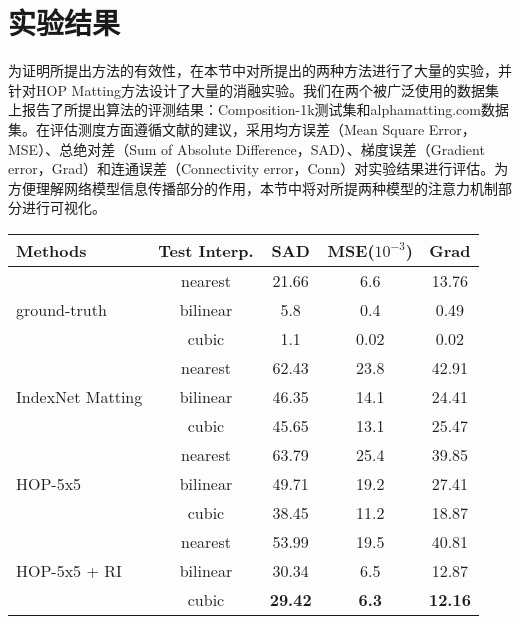 \section{实验结果}
为证明所提出方法的有效性，在本节中对所提出的两种方法进行了大量的实验，并针对HOP Matting方法设计了大量的消融实验。我们在两个被广泛使用的数据集上报告了所提出算法的评测结果：Composition-1k测试集\cite{xu2017deep}和alphamatting.com数据集\cite{rhemann2009perceptually}。在评估测度方面遵循文献\parencite{rhemann2009perceptually}的建议，采用均方误差（Mean Square Error，MSE）、总绝对差（Sum of Absolute Difference，SAD）、梯度误差（Gradient error，Grad）和连通误差（Connectivity error，Conn）对实验结果进行评估。为方便理解网络模型信息传播部分的作用，本节中将对所提两种模型的注意力机制部分进行可视化。


\begin{table}[t]
	\setlength{\tabcolsep}{15pt}
	\centering
	\begin{tabular}{l|cccc}  
		\toprule
		Methods & Test Interp.& SAD & MSE($10^{-3}$)  & Grad\\
		\midrule
		\multirow{3}{*}{ground-truth}&nearest& 21.66& 6.6& 13.76 \\
		& bilinear&5.8& 0.4&0.49 \\
		& cubic & 1.1& 0.02& 0.02\\
		\midrule
		\multirow{3}{*}{IndexNet Matting \cite{lu2019indices}}&nearest& 62.43& 23.8& 42.91 \\
		& bilinear&46.35& 14.1&24.41 \\
		& cubic & 45.65& 13.1& 25.47\\
		\midrule
		\multirow{3}{*}{HOP-5x5}&nearest&63.79&25.4&39.85\\
		& bilinear & 49.71 & 19.2 & 27.41\\
		& cubic & 38.45& 11.2  &18.87\\
		\midrule
		\multirow{3}{*}{HOP-5x5 + RI}  &nearest& 53.99 &19.5  &40.81\\
		& bilinear &30.34&6.5 &12.87\\
		& cubic & \textbf{29.42} & \textbf{6.3}&\textbf{12.16}\\
		\bottomrule
	\end{tabular}
	\label{tab5:RI}
\end{table}

